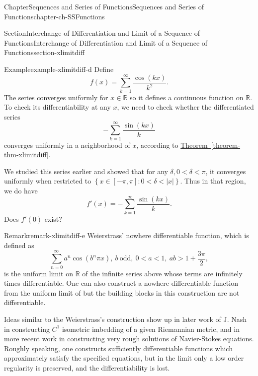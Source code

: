 \documentclass[oneside,10pt,]{book}
\newcommand{\xreffont}{\relax}
\numberwithin{equation}{section}
\newcommand{\bbR}{\mathbb{R}}
\newcommand{\lt}{<}
\begin{document}
\begin{chapterptx}{Chapter}{Sequences and Series of Functions}{}{Sequences and Series of Functions}{}{}{chapter-ch-SSFunctions}
\begin{sectionptx}{Section}{Interchange of Differentiation and Limit of a Sequence of  Functions}{}{Interchange of Differentiation and Limit of a Sequence of  Functions}{}{}{section-xlimitdiff}
\begin{example}{Example}{}{example-xlimitdiff-d}%
Define%
\begin{equation*}
f(x)= \sum_{k=1}^{\infty} \frac{ \cos (kx)}{k^2}\text{.}
\end{equation*}
The series converges uniformly for \(x\in\bbR\) so it defines a continuous function on \(\bbR\). To check its differentiability at any \(x\), we need to check whether the differentiated series%
\begin{equation*}
- \sum_{k=1}^{\infty} \frac{ \sin (kx)}{k}
\end{equation*}
converges uniformly in a neighborhood of \(x\), according to \hyperref[theorem-thm-xlimitdiff]{Theorem~{\xreffont\ref{theorem-thm-xlimitdiff}}}.%
\par
We studied this series earlier and showed that for any \(\delta, 0 \lt \delta \lt \pi\), it converges uniformly when restricted to \(\left\{x\in [-\pi, \pi]: 0 < \delta < |x|\right\}\). Thus in that region, we do have%
\begin{equation*}
f'(x)= -\sum_{k=1}^{\infty} \frac{ \sin (kx)}{k}\text{.}
\end{equation*}
Does \(f'(0)\) exist?%
\end{example}
\begin{remark}{Remark}{}{remark-xlimitdiff-e}%
Weierstrass' nowhere differentiable function, which is defined as%
\begin{equation*}
\sum ^{\infty \:}_{n=0}a^n\cos \left(b^n\pi x\right),\:b\:\text{odd},\:0 < a < 1,\:ab>1+\frac{3\pi }{2},
\end{equation*}
is the uniform limit on \(\bbR\) of the infinite series above whose terms are infinitely times differentiable. One can also construct a  nowhere differentiable function from the uniform limit of but the building blocks in this construction are not differentiable.%
\par
Ideas similar to the Weierstrass's construction show up in later work of J. Nash in constructing \(C^{1}\) isometric imbedding of a given Riemannian metric, and in more recent work in constructing very rough solutions of Navier-Stokes equations. Roughly speaking, one constructs sufficiently differentiable functions which approximately satisfy the specified equations, but in the limit only a low order regularity is preserved, and the differentiability is lost.%
\end{remark}
\end{sectionptx}
%
%
\typeout{************************************************}

\end{chapterptx}
\end{document}
